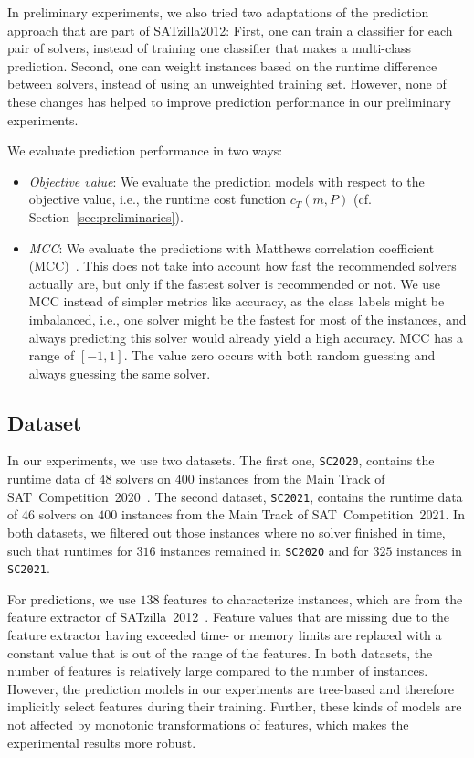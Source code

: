 \documentclass[runningheads]{llncs}
\begin{document}
In preliminary experiments, we also tried two adaptations of the prediction approach that are part of SATzilla2012:
First, one can train a classifier for each pair of solvers, instead of training one classifier that makes a multi-class prediction.
Second, one can weight instances based on the runtime difference between solvers, instead of using an unweighted training set.
However, none of these changes has helped to improve prediction performance in our preliminary experiments.

We evaluate prediction performance in two ways:

\begin{itemize}
	\item \emph{Objective value}:
	We evaluate the prediction models with respect to the objective value, i.e., the runtime cost function $c_{T}(m,P)$ (cf. Section~\ref{sec:preliminaries}). 
	\item \emph{MCC}:
	We evaluate the predictions with Matthews correlation coefficient (MCC)~\cite{matthews1975comparison,gorodkin2004comparing}.
	This does not take into account how fast the recommended solvers actually are, but only if the fastest solver is recommended or not.
	We use MCC instead of simpler metrics like accuracy, as the class labels might be imbalanced, i.e., one solver might be the fastest for most of the instances, and always predicting this solver would already yield a high accuracy.
	MCC has a range of $[-1,1]$. 
	The value zero occurs with both random guessing and always guessing the same solver.
\end{itemize}

\subsection{Dataset}

In our experiments, we use two datasets. 
The first one, \texttt{SC2020}, contains the runtime data of $48$ solvers on $400$ instances from the Main Track of SAT~Competition~2020~\cite{balyo2020proceedings,SC2020:AIJ}.
The second dataset, \texttt{SC2021}, contains the runtime data of $46$ solvers on $400$ instances from the Main Track of SAT~Competition~2021. 
In both datasets, we filtered out those instances where no solver finished in time, such that runtimes for $316$ instances remained in \texttt{SC2020} and for $325$ instances in \texttt{SC2021}.

For predictions, we use $138$ features to characterize instances, which are from the feature extractor of SATzilla~2012~\cite{xu2008satzilla,xu2012satzilla2012}. 
Feature values that are missing due to the feature extractor having exceeded time- or memory limits are replaced with a constant value that is out of the range of the features.
In both datasets, the number of features is relatively large compared to the number of instances.
However, the prediction models in our experiments are tree-based and therefore implicitly select features during their training.
Further, these kinds of models are not affected by monotonic transformations of features, which makes the experimental results more robust.
\end{document}
